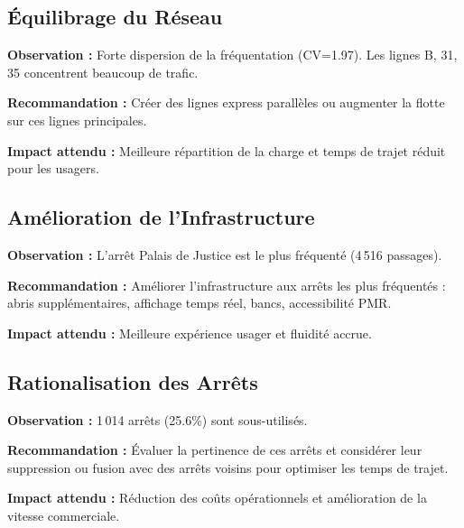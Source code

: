 \documentclass[12pt,a4paper]{article}
\begin{document}
\subsection{Équilibrage du Réseau}

\begin{infobox}
\textbf{Observation :} Forte dispersion de la fréquentation (CV=1.97). Les lignes B, 31, 35 concentrent beaucoup de trafic.

\textbf{Recommandation :} Créer des lignes express parallèles ou augmenter la flotte sur ces lignes principales.

\textbf{Impact attendu :} Meilleure répartition de la charge et temps de trajet réduit pour les usagers.
\end{infobox}

\subsection{Amélioration de l'Infrastructure}

\begin{infobox}
\textbf{Observation :} L'arrêt \og Palais de Justice \fg{} est le plus fréquenté (4\,516 passages).

\textbf{Recommandation :} Améliorer l'infrastructure aux arrêts les plus fréquentés : abris supplémentaires, affichage temps réel, bancs, accessibilité PMR.

\textbf{Impact attendu :} Meilleure expérience usager et fluidité accrue.
\end{infobox}

\subsection{Rationalisation des Arrêts}

\begin{infobox}
\textbf{Observation :} 1\,014 arrêts (25.6\%) sont sous-utilisés.

\textbf{Recommandation :} Évaluer la pertinence de ces arrêts et considérer leur suppression ou fusion avec des arrêts voisins pour optimiser les temps de trajet.

\textbf{Impact attendu :} Réduction des coûts opérationnels et amélioration de la vitesse commerciale.
\end{infobox}

\newpage
\end{document}
